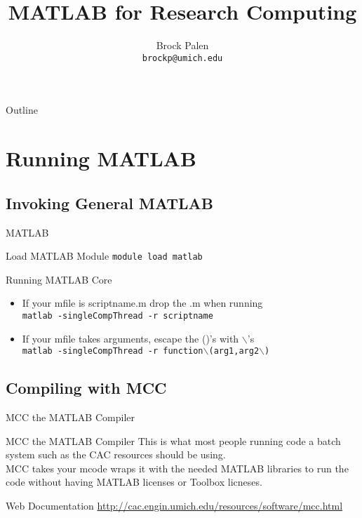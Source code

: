 \documentclass[handout]{beamer}
\title[MATLAB for Research Computing] {MATLAB for Research Computing}
\author{Brock Palen\\ \texttt{brockp@umich.edu}}
\begin{document}
  \begin{frame}
    \titlepage
  \end{frame}

  \begin{frame}{Outline}
    \tableofcontents
  \end{frame}
  
  \section{Running MATLAB}
   \subsection{Invoking General MATLAB}
   \begin{frame}{MATLAB}
    \begin{block}{Load MATLAB Module}
         \texttt{module load matlab}
    \end{block}
    \begin{block}{Running MATLAB Core}
     \begin{itemize}
      \item If your mfile is scriptname.m drop the .m when running \\
        \texttt{matlab -singleCompThread -r scriptname} 
      \item If your mfile takes arguments, escape the ()'s with $\backslash$'s \\
        \texttt{matlab -singleCompThread -r function$\backslash$(arg1,arg2$\backslash$)}
     \end{itemize}
    \end{block}
    
   \end{frame}


   \subsection{Compiling with MCC}
   \begin{frame}{MCC the MATLAB Compiler}
    \begin{block}{MCC the MATLAB Compiler}
     This is what most people running code a batch system such as the CAC resources should be using. \\
     MCC takes your mcode wraps it with the needed MATLAB libraries to run the code without having MATLAB licenses or Toolbox licneses.
    \end{block}
    \begin{block}{Web Documentation}
     \url{http://cac.engin.umich.edu/resources/software/mcc.html}
    \end{block}
   \end{frame}
 
\end{document}
